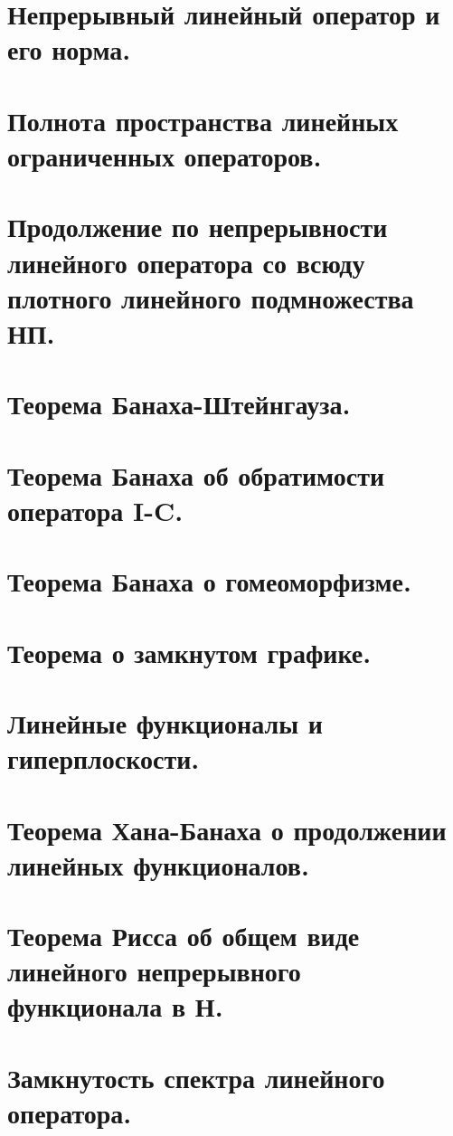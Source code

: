 \documentclass{article}
\begin{document}
\begin{sloppypar}
\section{Непрерывный линейный оператор и его норма.}

\section{Полнота пространства линейных ограниченных операторов.}

\section{Продолжение по непрерывности линейного оператора со всюду плотного линейного подмножества НП.}

\section{Теорема Банаха-Штейнгауза.}

\section{Теорема Банаха об обратимости оператора I-C.}

\section{Теорема Банаха о гомеоморфизме.}

\section{Теорема о замкнутом графике.}

\section{Линейные функционалы и гиперплоскости.}

\section{Теорема Хана-Банаха о продолжении линейных функционалов.}

\section{Теорема Рисса об общем виде линейного непрерывного функционала в Н.}

\section{Замкнутость спектра линейного оператора.}


\end{sloppypar}
\end{document}
